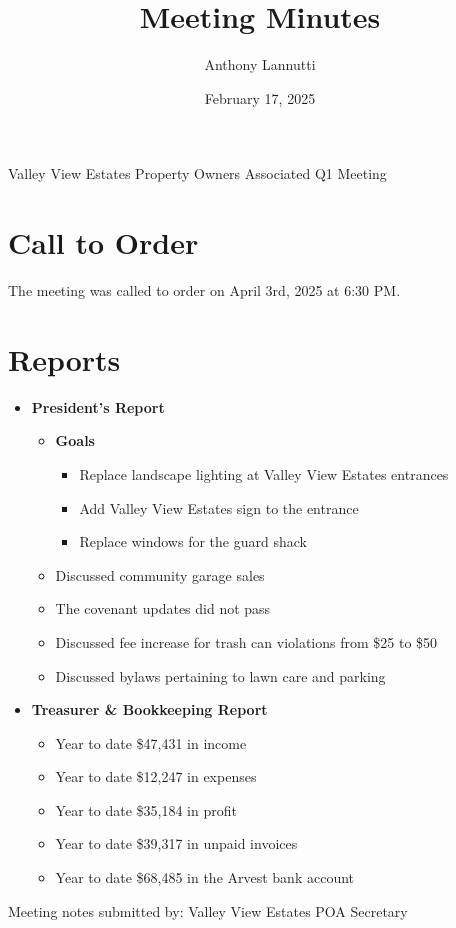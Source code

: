 \documentclass[12pt,a4paper]{article}
\author{Anthony Lannutti}
\date{February 17, 2025}
\title{Meeting Minutes}
\begin{document}
\begin{center}
  Valley View Estates Property Owners Associated Q1 Meeting\break{}
\end{center}

\section*{Call to Order}
\begin{flushleft}
The meeting was called to order on April 3rd, 2025 at 6:30 PM\@.
\end{flushleft}


\section*{Reports}
\begin{itemize}
  \item \textbf{President's Report}
  \begin{itemize}
  \item \textbf{Goals}
    \begin{itemize}
    \item Replace landscape lighting at Valley View Estates entrances
    \item Add Valley View Estates sign to the entrance
    \item Replace windows for the guard shack
    \end{itemize}
  \item Discussed community garage sales
  \item The covenant updates did not pass
  \item Discussed fee increase for trash can violations from \$25 to \$50
  \item Discussed bylaws pertaining to lawn care and parking
  \end{itemize}
  \item \textbf{Treasurer \& Bookkeeping Report}
  \begin{itemize}
  \item Year to date \$47,431 in income
  \item Year to date \$12,247 in expenses
  \item Year to date \$35,184 in profit
  \item Year to date \$39,317 in unpaid invoices
  \item Year to date \$68,485 in the Arvest bank account
  \end{itemize}
\end{itemize}

\begin{flushleft}
Meeting notes submitted by:\break{}
\@author\break{}
Valley View Estates POA Secretary
\end{flushleft}
\end{document}
